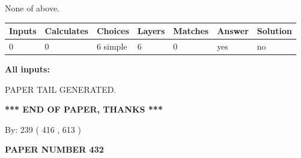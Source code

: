 \documentclass{ctexart}
\begin{document}
 
 None of above.
 
 
\noindent{}
 
 
   
   
   
   
\noindent\begin{tabular}{|l|l|l|l|l|l|l|}
 \hline
Inputs & Calculates & Choices & Layers & Matches & Answer & Solution \\ \hline
 0  & 
 0  & 
 6
  simple  
  & 
 6  & 
 0  & 
  yes & 
  no 
  \\ \hline
 \end{tabular}
   
   
   
   
\noindent{}
   
   
   
   
\noindent\vspace{0.1in}\hspace{-0.08in} {\textbf{\Large{All inputs: }}}
   
   
   
   
   
   
 \vspace{0.2in}
 
   
   
\vspace{2.0in} PAPER TAIL GENERATED.
   
   
   
   
\vspace{1.0in} 
{\textbf{\large{ *** END OF PAPER, THANKS *** }}} 
   
   
\hspace{1.0in} By: 
 239 ( 416 ,  613 )
   
   
   
   
\newpage 
\setcounter{page}{ 
   432001 } 
   
   
   
   
 {\textbf{ \Large{ PAPER NUMBER  432  }}}
   
   
\vspace{0.2in}
   
   
   
   
   
   
   
\end{document}
